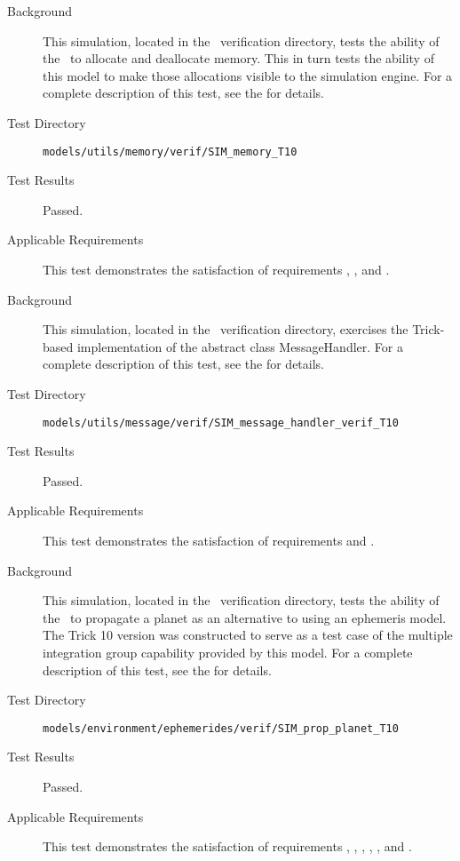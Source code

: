 \label{test:memory_model_sim}
\begin{description}
\item[Background]
This simulation, located in the \MEMORY\ verification directory,
tests the ability of the \MEMORY\ to allocate and deallocate
memory. This in turn tests the ability of this model to
make those allocations visible to the simulation engine.
 For a complete description of this test, see the
 for details.
\item[Test Directory]
\verb|models/utils/memory/verif/SIM_memory_T10|
\item[Test Results]
Passed.
\item[Applicable Requirements]
This test demonstrates the satisfaction of
requirements
,
,
and .
\end{description}


\label{test:message_model_sim}
\begin{description}
\item[Background]
This simulation, located in the \MESSAGE\ verification directory,
exercises the Trick-based implementation of the abstract
class MessageHandler.
For a complete description of this test, see the
 for details.
\item[Test Directory]
\verb|models/utils/message/verif/SIM_message_handler_verif_T10|
\item[Test Results]
Passed.
\item[Applicable Requirements]
This test demonstrates the satisfaction of
requirements 
and .
\end{description}


\label{test:sim_prop_planet}
\begin{description}
\item[Background]
This simulation, located in the \EPHEMERIDES\ verification directory,
tests the ability of the \EPHEMERIDES\ to propagate a planet as an
alternative to using an ephemeris model.
The Trick 10 version was constructed to serve as a test case
of the multiple integration group capability provided by this model. 
 For a complete description of this test, see the
 for details.
\item[Test Directory]
\verb|models/environment/ephemerides/verif/SIM_prop_planet_T10|
\item[Test Results]
Passed.
\item[Applicable Requirements]
This test demonstrates the satisfaction of
requirements ,
,
,
,
,
and .
\end{description}


